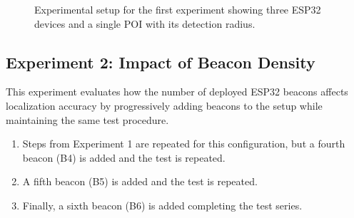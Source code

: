 \begin{figure}[H]
    \centering
    \caption{Experimental setup for the first experiment showing three ESP32 devices and a single POI with its detection radius.}
    \label{fig:exp1_setup}
\end{figure}

\subsection{Experiment 2: Impact of Beacon Density}
This experiment evaluates how the number of deployed ESP32 beacons affects localization accuracy by progressively adding beacons to the setup while maintaining the same test procedure.
\begin{enumerate}
    \item Steps from Experiment 1 are repeated for this configuration, but a fourth beacon (B4) is added and the test is repeated.
    \item A fifth beacon (B5) is added and the test is repeated.
    \item Finally, a sixth beacon (B6) is added completing the test series.
\end{enumerate}

